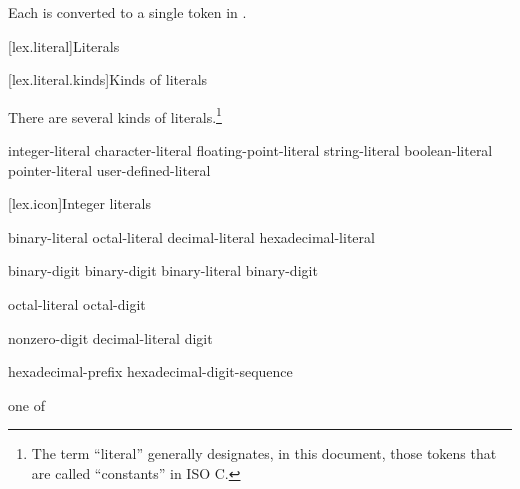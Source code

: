 Each  is converted to a single token
in .%
%

[lex.literal]{Literals}%

[lex.literal.kinds]{Kinds of literals}

\pnum
{}%
%
There are several kinds of literals.\footnote{The term ``literal'' generally designates, in this
document, those tokens that are called ``constants'' in
ISO C. }

\begin{bnf}
\br
    integer-literal\br
    character-literal\br
    floating-point-literal\br
    string-literal\br
    boolean-literal\br
    pointer-literal\br
    user-defined-literal
\end{bnf}

[lex.icon]{Integer literals}

%
\begin{bnf}
\br
    binary-literal \br
    octal-literal \br
    decimal-literal \br
    hexadecimal-literal 
\end{bnf}

\begin{bnf}
\br
     binary-digit\br
     binary-digit\br
    binary-literal  binary-digit
\end{bnf}

\begin{bnf}
\br
    \br
    octal-literal  octal-digit
\end{bnf}

\begin{bnf}
\br
    nonzero-digit\br
    decimal-literal  digit
\end{bnf}

\begin{bnf}
\br
    hexadecimal-prefix hexadecimal-digit-sequence
\end{bnf}

\begin{bnf}
 \textnormal{one of}\br
\end{bnf}

